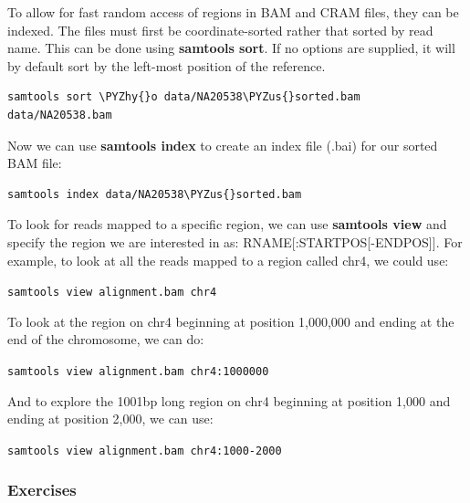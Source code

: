 \documentclass[11pt]{article}
\makeatletter
\def\PYZus{\char`\_}
\def\PYZhy{\char`\-}
\newcommand{\boxspacing}{\kern\kvtcb@left@rule\kern\kvtcb@boxsep}
\newcommand{\prompt}[4]{
        {\ttfamily\llap{{\color{blue}\LARGE\faKeyboardO\hspace{3pt}#4}}\vspace{-\baselineskip}}
    }
\makeatother
\begin{document}
To allow for fast random access of regions in BAM and CRAM files, they
can be indexed. The files must first be coordinate-sorted rather that
sorted by read name. This can be done using \textbf{samtools sort}. If
no options are supplied, it will by default sort by the left-most
position of the reference.

    \begin{tcolorbox}[breakable, size=fbox, boxrule=1pt, pad at break*=1mm,colback=cellbackground, colframe=cellborder]
\prompt{In}{incolor}{ }{\boxspacing}
\begin{Verbatim}[commandchars=\\\{\}]
samtools sort \PYZhy{}o data/NA20538\PYZus{}sorted.bam data/NA20538.bam
\end{Verbatim}
\end{tcolorbox}

    Now we can use \textbf{samtools index} to create an index file (.bai)
for our sorted BAM file:

    \begin{tcolorbox}[breakable, size=fbox, boxrule=1pt, pad at break*=1mm,colback=cellbackground, colframe=cellborder]
\prompt{In}{incolor}{ }{\boxspacing}
\begin{Verbatim}[commandchars=\\\{\}]
samtools index data/NA20538\PYZus{}sorted.bam
\end{Verbatim}
\end{tcolorbox}

    To look for reads mapped to a specific region, we can use
\textbf{samtools view} and specify the region we are interested in as:
RNAME{[}:STARTPOS{[}-ENDPOS{]}{]}. For example, to look at all the reads
mapped to a region called chr4, we could use:

    \texttt{samtools\ view\ alignment.bam\ chr4}

    To look at the region on chr4 beginning at position 1,000,000 and ending
at the end of the chromosome, we can do:

    \texttt{samtools\ view\ alignment.bam\ chr4:1000000}

    And to explore the 1001bp long region on chr4 beginning at position
1,000 and ending at position 2,000, we can use:

    \texttt{samtools\ view\ alignment.bam\ chr4:1000-2000}

    \hypertarget{exercises}{%
\subsubsection{Exercises}\label{exercises}}
\end{document}

